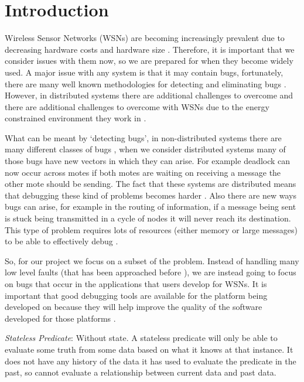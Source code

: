 \section{Introduction}

Wireless Sensor Networks (WSNs) are becoming increasingly prevalent due to decreasing hardware costs and hardware size \cite{TankBible}. Therefore, it is important that we consider issues with them now, so we are prepared for when they become widely used. A major issue with any system is that it may contain bugs, fortunately, there are many well known methodologies for detecting and eliminating bugs \cite{1382572, 749477, ?}. However, in distributed systems there are additional challenges to overcome \cite{5010224} and there are additional challenges to overcome with WSNs due to the energy constrained environment they work in \cite{?}.

What can be meant by `detecting bugs', in non-distributed systems there are many different classes of bugs \cite{?}, when we consider distributed systems many of those bugs have new vectors in which they can arise. For example deadlock can now occur across motes if both motes are waiting on receiving a message the other mote should be sending. The fact that these systems are distributed means that debugging these kind of problems becomes harder \cite{?}. Also there are new ways bugs can arise, for example in the routing of information, if a message being sent is stuck being transmitted in a cycle of nodes it will never reach its destination. This type of problem requires lots of resources (either memory or large messages) to be able to effectively debug \cite{?}.

So, for our project we focus on a subset of the problem. Instead of handling many low level faults (that has been approached before \cite{NodeMD}), we are instead going to focus on bugs that occur in the applications that users develop for WSNs. It is important that good debugging tools are available for the platform being developed on because they will help improve the quality of the software developed for those platforms \cite{?}.

\begin{mydef}
\emph{Stateless Predicate}: Without state. A stateless predicate will only be able to evaluate some truth from some data based on what it knows at that instance. It does not have any history of the data it has used to evaluate the predicate in the past, so cannot evaluate a relationship between current data and past data.
\end{mydef}


